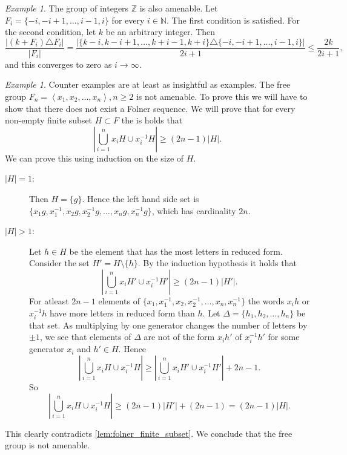 \documentclass[titlepage, a4paper]{article}
\newcommand{\N}{\mathbb{N}}
\newcommand{\Z}{\mathbb{Z}}
\newcommand{\card}[1]{\left| #1 \right|}
\theoremstyle{remark}
\newtheorem{example}[theorem]{Example}
\begin{document}
\begin{example}\label{ex:integers_folner}
    The group of integers $\Z$ is also amenable. Let $F_i = \{-i, -i+1, \dots, i-1, i\}$ for every $i \in \N$. The first condition is satisfied. For the second condition, let $k$ be an arbitrary integer. Then
    \[
        \frac{\card{(k + F_i) \triangle F_i}}{\card{F_i}}
        = \frac{\card{\{k-i, k-i+1, \dots, k+i-1, k+i\}\triangle \{-i, -i+1, \dots, i-1, i\}}}{2i+1}
        \leq \frac{2k}{2i+1},
    \]
    and this converges to zero as $i \to \infty$.
\end{example}

\begin{example}
	Counter examples are at least as insightful as examples. 
	The free group $F_n = \left<x_1, x_2, \ldots, x_n \right>, n \ge 2$ is not amenable. 
	To prove this we will have to show that there does not exist a Folner sequence.
	We will prove that for every non-empty finite subset $H \subset F$ the is holds that \[
		\card{\bigcup_{i = 1}^{n} x_iH \cup x_i^{-1}H} \ge (2n-1) \card{H}
	.\] 
	We can prove this using induction on the size of $H$. 
	\begin{description}
		\item[$\card{H} = 1$:] Then $H = \{g\}$. 
			Hence the left hand side set is $\{x_1g, x_1^{-1}, x_2g, x_2^{-1}g, \ldots, x_ng, x_n^{-1}g\} $, which has cardinality $2n$. 
		\item[$\card{H} > 1$:] 
			Let $ h \in H$ be the element that has the most letters in reduced form.
			Consider the set $H' = H\setminus \{h\} $. 
			By the induction hypothesis it holds that
			\[	
				\card{\bigcup_{i = 1}^{n} x_iH' \cup x_i^{-1}H'} \ge (2n-1) \card{H'}
			.\] 
			For atleast $2n-1$ elements of $\{x_1,x_1^{-1},x_2,x_2^{-1},\ldots, x_n, x_n^{-1}\} $ the words $x_ih$ or  $x_i^{-1}h$ have more letters in reduced form than $h$. Let $\Delta = \{ h_1, h_2, \ldots, h_n\} $ be that set.  
			As multiplying by one generator changes the number of letters by $\pm 1$, we see that elements of $\Delta$ are not of the form $x_ih'$ of $x_i^{-1}h'$ for some generator $x_i$ and $h' \in H$. 
			Hence \[
				\card{\bigcup_{i = 1}^{n} x_iH \cup x_i^{-1}H}  \ge \card{\bigcup_{i = 1}^{n} x_iH' \cup x_i^{-1}H'} + 2n-1
 			.\]
			So \[
				\card{\bigcup_{i = 1}^{n} x_iH \cup x_i^{-1}H} \ge (2n-1)\card{H'} + (2n-1) = (2n-1 ) \card{H}
			.\]
	\end{description}
	This clearly contradicts \cref{lem:folner_finite_subset}. 
	We conclude that the free group is not amenable. 
\end{example}
\end{document}
